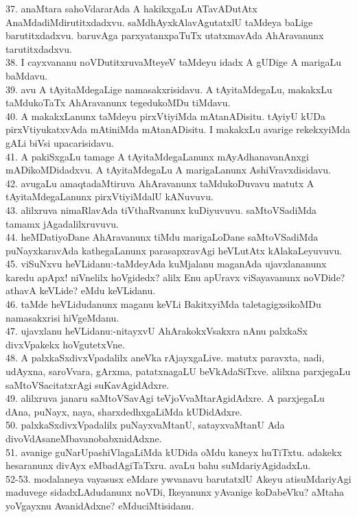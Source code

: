 \documentclass{article}
\begin{document}
37. anaMtara sahoVdararAda A hakikxgaLu ATavADutAtx AnaMdadiMdirutitxdadxvu. saMdhAyxkAlavAgutatxlU taMdeya baLige barutitxdadxvu. baruvAga parxyatanxpaTuTx utatxmavAda AhAravanunx tarutitxdadxvu.\\
38. I cayxvananu noVDutitxruvaMteyeV taMdeyu idadx A gUDige A marigaLu baMdavu.\\
39. avu A tAyitaMdegaLige namasakxrisidavu. A tAyitaMdegaLu, makakxLu taMdukoTaTx AhAravanunx tegedukoMDu tiMdavu.\\
40. A makakxLanunx taMdeyu pirxVtiyiMda mAtanADisitu. tAyiyU kUDa pirxVtiyukatxvAda mAtiniMda mAtanADisitu. I makakxLu avarige rekekxyiMda gALi biVsi upacarisidavu.\\
41. A pakiSxgaLu tamage A tAyitaMdegaLanunx mAyAdhanavanAnxgi mADikoMDidadxvu. A tAyitaMdegaLu A marigaLanunx AshiVravxdisidavu.\\
42. avugaLu amaqtadaMtiruva AhAravanunx taMdukoDuvavu matutx A tAyitaMdegaLanunx pirxVtiyiMdalU kANuvuvu.\\
43. alilxruva nimaRlavAda tiVthaRvanunx kuDiyuvuvu. saMtoVSadiMda tamamx jAgadalilxruvuvu.\\
44. heMDatiyoDane AhAravanunx tiMdu marigaLoDane saMtoVSadiMda puNayxkaravAda kathegaLanunx parasapxravAgi heVLutAtx kAlakaLeyuvuvu.\\
45. viSuNxvu heVLidanu:-taMdeyAda kuMjalanu maganAda ujavxlananunx karedu apApx! niVnelilx hoVgidedx? alilx Enu apUravx viSayavanunx noVDide? athavA keVLide? eMdu keVLidanu.\\
46. taMde heVLidudanunx maganu keVLi BakitxyiMda taletagigxsikoMDu namasakxrisi hiVgeMdanu.\\
47. ujavxlanu heVLidanu:-nitayxvU AhArakokxVsakxra nAnu palxkaSx divxVpakekx hoVgutetxVne.\\
48. A palxkaSxdivxVpadalilx aneVka rAjayxgaLive. matutx paravxta, nadi, udAyxna, saroVvara, gArxma, patatxnagaLU beVkAdaSiTxve. alilxna parxjegaLu saMtoVSacitatxrAgi suKavAgidAdxre.\\
49. alilxruva janaru saMtoVSavAgi teVjoVvaMtarAgidAdxre. A parxjegaLu dAna, puNayx, naya, sharxdedhxgaLiMda kUDidAdxre.\\
50. palxkaSxdivxVpadalilx puNayxvaMtanU, satayxvaMtanU Ada divoVdAsaneMbavanobabxnidAdxne.\\
51. avanige guNarUpashiVlagaLiMda kUDida oMdu kaneyx huTiTxtu. adakekx hesaranunx divAyx eMbadAgiTaTxru. avaLu bahu suMdariyAgidadxLu.\\
52-53. modalaneya vayasusx eMdare ywvanavu barutatxlU Akeyu atisuMdariyAgi maduvege sidadxLAdudanunx noVDi, Ikeyanunx yAvanige koDabeVku? aMtaha yoVgayxnu AvanidAdxne? eMduciMtisidanu.\\
\end{document}
